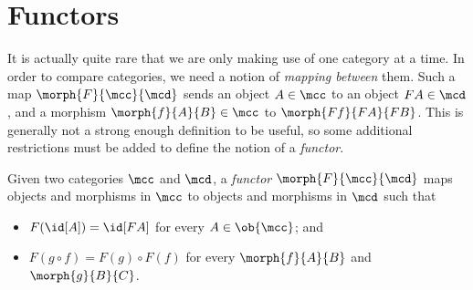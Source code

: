 \section{Functors}\label{sec:functors}

It is actually quite rare that we are only making use of one category at a time.
In order to compare categories, we need a notion of \emph{mapping between} them.
Such a map \(\morph{F}{\mcc}{\mcd}\) sends an object \(A \in \mcc\) to an
object \(FA \in \mcd\), and a morphism \(\morph{f}{A}{B} \in \mcc\) to
\(\morph{Ff}{FA}{FB}\).
This is generally not a strong enough definition to be useful, so some
additional restrictions must be added to define the notion of a \emph{functor}.

\begin{definition}[Functor]
    Given two categories \(\mcc\) and \(\mcd\), a \emph{functor} \(
    \morph{F}{\mcc}{\mcd}
    \) maps objects and morphisms in \(\mcc\) to objects and morphisms in
    \(\mcd\) such that
    \begin{itemize}
        \item \(F(\id[A]) = \id[FA]\) for every \(A \in \ob{\mcc}\); and
        \item \(F(g \circ f) = F(g) \circ F(f)\) for every \(\morph{f}{A}{B}\)
              and \(\morph{g}{B}{C}\).
    \end{itemize}

    \begin{center}
        \qquad
    \end{center}
\end{definition}

